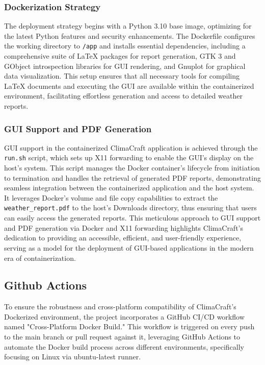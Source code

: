 \documentclass[sn-mathphys-num]{sn-jnl}%
\begin{document}
\subsubsection{Dockerization Strategy}\label{sec3.5.1}
The deployment strategy begins with a Python 3.10 base image, optimizing for the latest Python features and security enhancements. The Dockerfile configures the working directory to \texttt{/app} and installs essential dependencies, including a comprehensive suite of LaTeX packages for report generation, GTK 3 and GObject introspection libraries for GUI rendering, and Gnuplot for graphical data visualization. This setup ensures that all necessary tools for compiling LaTeX documents and executing the GUI are available within the containerized environment, facilitating effortless generation and access to detailed weather reports.

\subsubsection{GUI Support and PDF Generation}\label{sec3.5.2}
GUI support in the containerized ClimaCraft application is achieved through the \texttt{run.sh} script, which sets up X11 forwarding to enable the GUI's display on the host's system. This script manages the Docker container's lifecycle from initiation to termination and handles the retrieval of generated PDF reports, demonstrating seamless integration between the containerized application and the host system. It leverages Docker's volume and file copy capabilities to extract the \texttt{weather\_report.pdf} to the host's Downloads directory, thus ensuring that users can easily access the generated reports. This meticulous approach to GUI support and PDF generation via Docker and X11 forwarding highlights ClimaCraft's dedication to providing an accessible, efficient, and user-friendly experience, serving as a model for the deployment of GUI-based applications in the modern era of containerization.


\subsection{Github Actions}\label{sec3.6}
To ensure the robustness and cross-platform compatibility of ClimaCraft's Dockerized environment, the project incorporates a GitHub CI/CD workflow named "Cross-Platform Docker Build." This workflow is triggered on every push to the main branch or pull request against it, leveraging GitHub Actions to automate the Docker build process across different environments, specifically focusing on Linux via ubuntu-latest runner.
\end{document}
